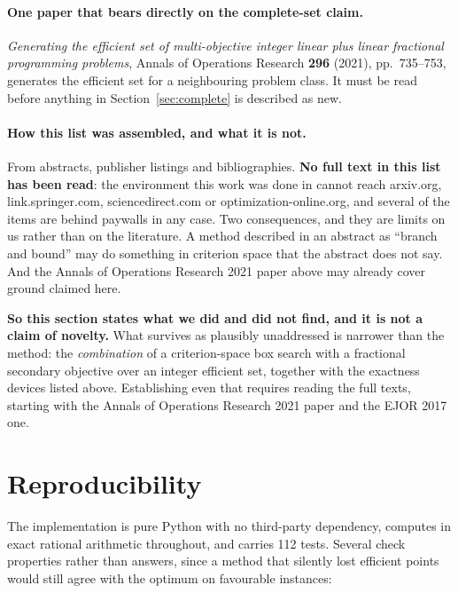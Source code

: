 \documentclass[11pt,a4paper]{article}
\begin{document}
\paragraph{One paper that bears directly on the complete-set claim.}
\emph{Generating the efficient set of multi-objective integer linear plus
linear fractional programming problems}, Annals of Operations Research
\textbf{296} (2021), pp.~735--753, generates the efficient set for a
neighbouring problem class. It must be read before anything in
Section~\ref{sec:complete} is described as new.

\paragraph{How this list was assembled, and what it is not.}
From abstracts, publisher listings and bibliographies. \textbf{No full text in
this list has been read}: the environment this work was done in cannot reach
arxiv.org, link.springer.com, sciencedirect.com or optimization-online.org, and
several of the items are behind paywalls in any case. Two consequences, and
they are limits on us rather than on the literature. A method described in an
abstract as ``branch and bound'' may do something in criterion space that the
abstract does not say. And the Annals of Operations Research 2021 paper above
may already cover ground claimed here.

\textbf{So this section states what we did and did not find, and it is not a
claim of novelty.} What survives as plausibly unaddressed is narrower than the
method: the \emph{combination} of a criterion-space box search with a
fractional secondary objective over an integer efficient set, together with the
exactness devices listed above. Establishing even that requires reading the
full texts, starting with the Annals of Operations Research 2021 paper and the
EJOR 2017 one.

\section{Reproducibility}

The implementation is pure Python with no third-party dependency, computes in
exact rational arithmetic throughout, and carries 112 tests. Several check
properties rather than answers, since a method that silently lost efficient
points would still agree with the optimum on favourable instances:
\end{document}
